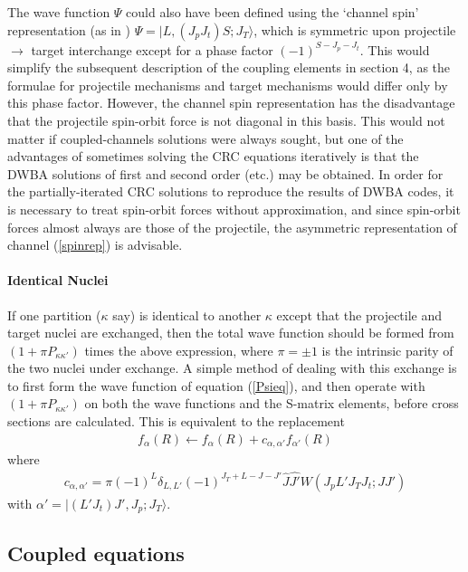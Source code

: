 \documentclass[11pt,a4paper]{article}
\begin{document}
The wave function $\Psi$ could also have been defined using the `channel
spin' representation (as in \cite{OUKID})
$\Psi = | L, (J_p J_t)S; J_T\rangle $,
which is symmetric upon projectile $\rightarrow$ target interchange except for
a phase factor $ (-1)^{S - J_p - J_t} $.
This would simplify the subsequent description of the coupling elements in
section 4, as the formulae for projectile mechanisms and target mechanisms
would differ only by this phase factor.  However, the channel spin
representation has the disadvantage that the projectile spin-orbit force
is not diagonal in this basis.  This would not matter if coupled-channels
solutions were always sought, but one of the advantages of sometimes
solving the CRC equations iteratively is that the DWBA solutions of first and
second order (etc.) may be obtained. In order for the partially-iterated
CRC solutions to reproduce the results of DWBA codes, it is necessary to
treat spin-orbit forces without approximation, and since spin-orbit forces
almost always are those of the projectile, the asymmetric representation
of channel (\ref{spinrep}) is advisable.
\paragraph{Identical Nuclei}

If one partition ($\kappa$ say)
is identical to another $\kappa$ except that the projectile
and target nuclei are exchanged,
then the total wave function should be formed from
$(1 + \pi P_{\kappa\kappa'}) $ times the above expression,
where $\pi =\pm1$ is the intrinsic parity of the two nuclei under
exchange.
A simple method of dealing with this exchange is to first form the
wave function of equation (\ref{Psieq}), and then operate with
$(1 + \pi P_{\kappa\kappa'}) $
on both the wave functions and the S-matrix elements,
before cross sections are calculated.
This is equivalent to the replacement
\begin{eqnarray}
{f _\alpha (R) \leftarrow f _\alpha (R) + c_{\alpha ,\alpha'} f_{\alpha'} (R) }
\end{eqnarray}
where
\begin{eqnarray}
c_{\alpha ,\alpha'}  =
     \pi (-1)^L \delta_{L,L'} (-1)^{J_T + L - J - J'}
     \hat{J} \hat{J'} W(J_p L' J_T J_t ; J J')
\end{eqnarray}
with $\alpha' = | (L' J_t)J' , J_p ; J_T\rangle $.

\subsection{Coupled equations}
\newcommand{\RK}{{(R_\kappa)}}
\newcommand{\RKP}{{(R_{\kappa'})}}
\end{document}

